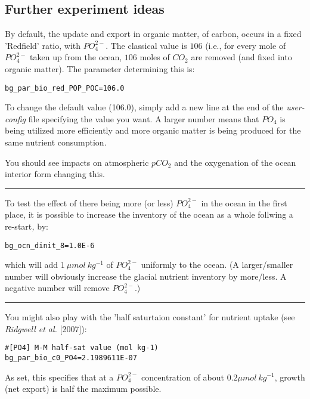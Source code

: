 \subsection{Further experiment ideas}

\noindent By default, the update and export in organic matter, of carbon, occurs in a fixed 'Redfield' ratio, with \(PO^{2-}_{4}\). The classical value is \(106\) (i.e., for every mole of \(PO^{2-}_{4}\) taken up from the ocean, \(106\) moles of \(CO_{2}\) are removed (and fixed into organic matter). The parameter determining this is:
\vspace{-2mm}\small\begin{verbatim}
bg_par_bio_red_POP_POC=106.0
\end{verbatim}\normalsize\vspace{-2mm}
To change the default value (106.0), simply add a new line at the end of the \textit{user-config} file specifying the value you want. A larger number means that \(PO_{4}\) is being utilized more efficiently and more organic matter is being produced for the same nutrient consumption.

You should see impacts on atmospheric \(pCO_{2}\) and the oxygenation of the ocean interior form changing this.

\vspace{1mm} \noindent\rule{4cm}{0.5pt} \vspace{2mm}

\noindent To test the effect of there being more (or less) \(PO^{2-}_{4}\) in the ocean in the first place, it is possible to increase the inventory of the ocean as a whole follwing a re-start\textit{, }by:
\vspace{-2mm}\small\begin{verbatim}
bg_ocn_dinit_8=1.0E-6
\end{verbatim}\normalsize\vspace{-2mm}
which will add \(1\:\mu mol\:kg^{-1}\) of \(PO^{2-}_{4}\) uniformly to the ocean. (A larger/smaller number will obviously increase the glacial nutrient inventory by more/less. A negative number will remove \(PO^{2-}_{4}\).)

\vspace{1mm} \noindent\rule{4cm}{0.5pt} \vspace{2mm}

\noindent You might also play with the 'half saturtaion constant' for nutrient uptake (see \textit{Ridgwell et al.} [2007]):
\vspace{-2mm}\small\begin{verbatim}
#[PO4] M-M half-sat value (mol kg-1)
bg_par_bio_c0_PO4=2.1989611E-07
\end{verbatim}\normalsize\vspace{-1mm}
As set, this specifies that at a \(PO^{2-}_{4}\) concentration of about \(0.2 \mu mol \:kg^{-1} \), growth (net export) is half the maximum possible.


